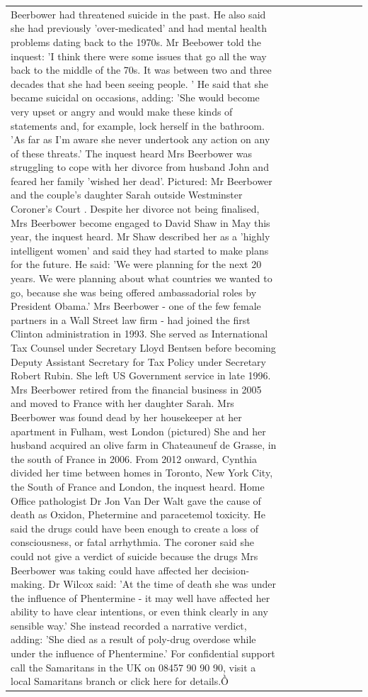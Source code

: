 \begin{table}[H]
\begin{tabular}{lllrlllll}
Beerbower had threatened suicide in the past. He also said she had previously 'over-medicated' and had mental health problems dating back to the 1970s. Mr Beebower told the inquest: 'I think there were some issues that go all the way back to the middle of the 70s. It was between two and three decades that she had been seeing people. ' He said that she became suicidal on occasions, adding: 'She would become very upset or angry and would make these kinds of statements and, for example, lock herself in the bathroom. 'As far as I'm aware she never undertook any action on any of these threats.' The inquest heard Mrs Beerbower was struggling to cope with her divorce from husband John and feared her family 'wished her dead'. Pictured: Mr Beerbower and the couple's daughter Sarah outside Westminster Coroner's Court . Despite her divorce not being finalised, Mrs Beerbower become engaged to David Shaw in May this year, the inquest heard. Mr Shaw described her as a 'highly intelligent women' and said they had started to make plans for the future. He said: 'We were planning for the next 20 years. We were planning about what countries we wanted to go, because she was being offered ambassadorial roles by President Obama.' Mrs Beerbower - one of the few female partners in a Wall Street law firm - had joined the first Clinton administration in 1993. She served as International Tax Counsel under Secretary Lloyd Bentsen before becoming Deputy Assistant Secretary for Tax Policy under Secretary Robert Rubin. She left US Government service in late 1996. Mrs Beerbower retired from the financial business in 2005 and moved to France with her daughter Sarah. Mrs Beerbower was found dead by her housekeeper at her apartment in Fulham, west London (pictured) She and her husband acquired an olive farm in Chateauneuf de Grasse, in the south of France in 2006. From 2012 onward, Cynthia divided her time between homes in Toronto, New York City, the South of France and London, the inquest heard. Home Office pathologist Dr Jon Van Der Walt gave the cause of death as Oxidon, Phetermine and paracetemol toxicity. He said the drugs could have been enough to create a loss of consciousness, or fatal arrhythmia. The coroner said she could not give a verdict of suicide because the drugs Mrs Beerbower was taking could have affected her decision-making. Dr Wilcox said: 'At the time of death she was under the influence of Phentermine - it may well have affected her ability to have clear intentions, or even think clearly in any sensible way.' She instead recorded a narrative verdict, adding: 'She died as a result of poly-drug overdose while under the influence of Phentermine.' For confidential support call the Samaritans in the UK on 08457 90 90 90, visit a local Samaritans branch or click here for details.Ồ \\

\end{tabular}
\end{table}
